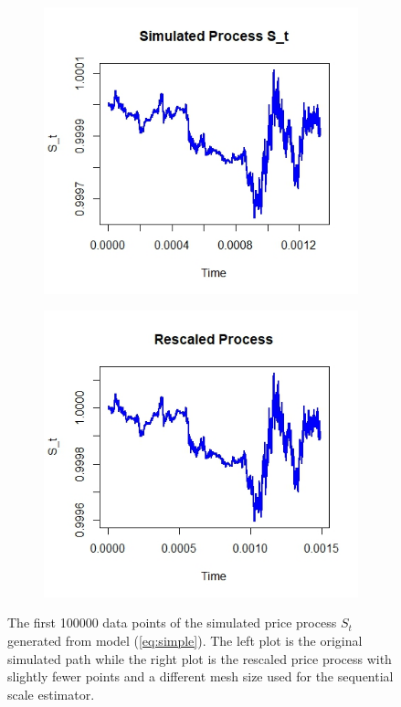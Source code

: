\documentclass{article}
\begin{document}
\begin{figure}[htbp]
    \centering
    
    \begin{subfigure}{0.48\textwidth}
        \includegraphics[width=\linewidth]{price_plot.jpeg}
    \end{subfigure}
    \hfill
    \begin{subfigure}{0.48\textwidth}
        \includegraphics[width=\linewidth]{price_rescaled.jpeg}
    \end{subfigure}
    
    \caption{The first 100000 data points of the simulated price process $S_t$ generated from model (\ref{eq:simple}). The left plot is the original simulated path while the right plot is the rescaled price process with slightly fewer points and a different mesh size used for the sequential scale estimator.}
    \label{fig:ex5price}
\end{figure}\\\\
\end{document}
